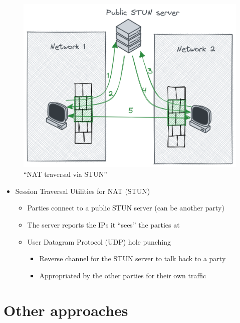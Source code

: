 \begin{figure}
\centering
\includegraphics[width=\textwidth,height=0.66\textheight]{presentation/../figures/nat-traversal.png}
\caption{``NAT traversal via STUN''\label{nat-traversal}}
\end{figure}

\begin{itemize}
\tightlist
\item
  Session Traversal Utilities for NAT (STUN)

  \begin{itemize}
  \tightlist
  \item
    Parties connect to a public STUN server (can be another party)
  \item
    The server reports the IPs it ``sees'' the parties at
  \item
    User Datagram Protocol (UDP) hole punching

    \begin{itemize}
    \tightlist
    \item
      Reverse channel for the STUN server to talk back to a party
    \item
      Appropriated by the other parties for their own traffic
    \end{itemize}
  \end{itemize}
\end{itemize}

\hypertarget{other-approaches}{%
\part{Other approaches}\label{other-approaches}}

